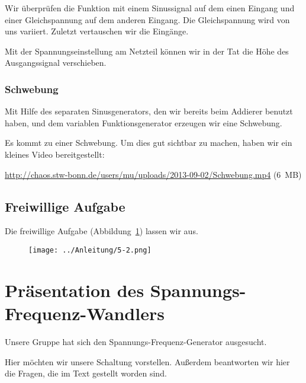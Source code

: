 Wir überprüfen die Funktion mit einem Sinussignal auf dem einen Eingang und
einer Gleichspannung auf dem anderen Eingang. Die Gleichspannung wird von uns
variiert. Zuletzt vertauschen wir die Eingänge.

Mit der Spannungseinstellung am Netzteil können wir in der Tat die Höhe des
Ausgangssignal verschieben.

\subsubsection{Schwebung}

Mit Hilfe des separaten Sinusgenerators, den wir bereits beim Addierer benutzt
haben, und dem variablen Funktionsgenerator erzeugen wir eine Schwebung.

Es kommt zu einer Schwebung. Um dies gut sichtbar zu machen, haben wir ein
kleines Video bereitgestellt:

\url{http://chaos.stw-bonn.de/users/mu/uploads/2013-09-02/Schwebung.mp4} (6~MB)

\FloatBarrier
\subsection{Freiwillige Aufgabe}

Die freiwillige Aufgabe (Abbildung~\ref{fig:5-2}) lassen wir aus.

\begin{figure}[htbp]
	\centering
	\texttt{[image: ../Anleitung/5-2.png]}
	\caption{%
		\cite[Abbildung~5.2]{physik313-Anleitung}
	}
	\label{fig:5-2}
\end{figure}


\section{Präsentation des Spannungs-Frequenz-Wandlers}

Unsere Gruppe hat sich den Spannungs-Frequenz-Generator ausgesucht.

Hier möchten wir unsere Schaltung vorstellen. Außerdem beantworten wir hier die
Fragen, die im Text gestellt worden sind.

